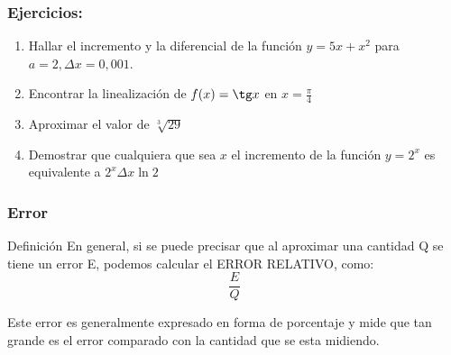 \documentclass[utf8x]{beamer}
\begin{document}
\begin{frame}
\frametitle{Ejercicios:}

\begin{enumerate}
\item
Hallar el incremento y la diferencial de la función $y= 5x+x^2$ para $a= 2, \Delta x = 0,001$.
\item
Encontrar la linealización de $f(x) = \tg x $ en $x= \frac{\pi}{4}$

\item
Aproximar el valor de $\sqrt[3]{29}$

\item
Demostrar que cualquiera que sea $x$ el incremento de la función $y=2^x$ es equivalente a $2^x \Delta x \ln 2$

\end{enumerate}

\end{frame}



\begin{frame}
\frametitle{Error}

\begin{block}{Definición}
En general, si se puede precisar que al aproximar una cantidad Q se tiene un error E,   podemos calcular el ERROR RELATIVO, como:  $$\frac{E}{Q}$$


Este error es generalmente expresado en forma de porcentaje y mide que tan grande es el error comparado con la cantidad que se esta midiendo.

\end{block}

\end{frame}

\end{document}
